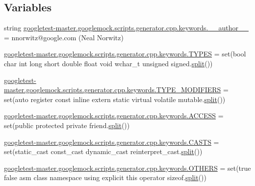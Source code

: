 \subsection*{Variables}
\begin{DoxyCompactItemize}
\item 
string \mbox{\hyperlink{namespacegoogletest-master_1_1googlemock_1_1scripts_1_1generator_1_1cpp_1_1keywords_a7ed4b3471aae320bd1fc6ba704972960}{googletest-\/master.\+googlemock.\+scripts.\+generator.\+cpp.\+keywords.\+\_\+\+\_\+author\+\_\+\+\_\+}} = \textquotesingle{}nnorwitz@google.\+com (Neal Norwitz)\textquotesingle{}
\item 
\mbox{\hyperlink{namespacegoogletest-master_1_1googlemock_1_1scripts_1_1generator_1_1cpp_1_1keywords_a368ea4b63e6e7fd1470be2a7ff5d151e}{googletest-\/master.\+googlemock.\+scripts.\+generator.\+cpp.\+keywords.\+T\+Y\+P\+ES}} = set(\textquotesingle{}bool char int long short double float void wchar\+\_\+t unsigned signed\textquotesingle{}.\mbox{\hyperlink{_input_8h_aec2fd8cd9140a1b535dc54a924396f40}{split}}())
\item 
\mbox{\hyperlink{namespacegoogletest-master_1_1googlemock_1_1scripts_1_1generator_1_1cpp_1_1keywords_a2f3f28ccae1426b1e62d0316200eb91e}{googletest-\/master.\+googlemock.\+scripts.\+generator.\+cpp.\+keywords.\+T\+Y\+P\+E\+\_\+\+M\+O\+D\+I\+F\+I\+E\+RS}} = set(\textquotesingle{}auto register const inline extern static virtual volatile mutable\textquotesingle{}.\mbox{\hyperlink{_input_8h_aec2fd8cd9140a1b535dc54a924396f40}{split}}())
\item 
\mbox{\hyperlink{namespacegoogletest-master_1_1googlemock_1_1scripts_1_1generator_1_1cpp_1_1keywords_abfde068913a484374a1899428a0176aa}{googletest-\/master.\+googlemock.\+scripts.\+generator.\+cpp.\+keywords.\+A\+C\+C\+E\+SS}} = set(\textquotesingle{}public protected private friend\textquotesingle{}.\mbox{\hyperlink{_input_8h_aec2fd8cd9140a1b535dc54a924396f40}{split}}())
\item 
\mbox{\hyperlink{namespacegoogletest-master_1_1googlemock_1_1scripts_1_1generator_1_1cpp_1_1keywords_a0dd5861d4a309f2bcd39e96d14c633c7}{googletest-\/master.\+googlemock.\+scripts.\+generator.\+cpp.\+keywords.\+C\+A\+S\+TS}} = set(\textquotesingle{}static\+\_\+cast const\+\_\+cast dynamic\+\_\+cast reinterpret\+\_\+cast\textquotesingle{}.\mbox{\hyperlink{_input_8h_aec2fd8cd9140a1b535dc54a924396f40}{split}}())
\item 
\mbox{\hyperlink{namespacegoogletest-master_1_1googlemock_1_1scripts_1_1generator_1_1cpp_1_1keywords_abce05e082d0468b9b9689576cffb1bdb}{googletest-\/master.\+googlemock.\+scripts.\+generator.\+cpp.\+keywords.\+O\+T\+H\+E\+RS}} = set(\textquotesingle{}true false asm class namespace using explicit this operator sizeof\textquotesingle{}.\mbox{\hyperlink{_input_8h_aec2fd8cd9140a1b535dc54a924396f40}{split}}())

\end{DoxyCompactItemize}
